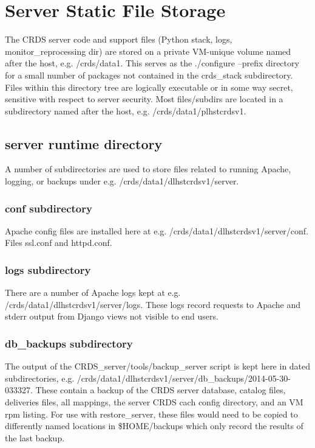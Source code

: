 \documentclass[letterpaper,10pt,english]{sphinxmanual}
\begin{document}
\section{Server Static File Storage}
\label{server_guide:server-static-file-storage}
The CRDS server code and support files (Python stack, logs, monitor\_reprocessing dir) are stored on
a private VM-unique volume named after the host,  e.g.  /crds/data1.  This serves as the
./configure --prefix directory for a small number of packages not contained in the crds\_stack subdirectory.
Files within this directory tree are logically executable or in some way secret,  sensitive with respect
to server security.   Most files/subdirs are located in a subdirectory named after the host,
e.g. /crds/data1/plhstcrdsv1.


\subsection{server runtime directory}
\label{server_guide:server-runtime-directory}
A number of subdirectories are used to store files related to running Apache, logging, or backups under
e.g. /crds/data1/dlhstcrdsv1/server.


\subsubsection{conf subdirectory}
\label{server_guide:conf-subdirectory}
Apache config files are installed here at e.g. /crds/data1/dlhstcrdsv1/server/conf.  Files ssl.conf and httpd.conf.


\subsubsection{logs subdirectory}
\label{server_guide:logs-subdirectory}
There are a number of Apache logs kept at e.g. /crds/data1/dlhstcrdsv1/server/logs.  These logs record requests to
Apache and stderr output from Django views not visible to end users.


\subsubsection{db\_backups subdirectory}
\label{server_guide:db-backups-subdirectory}
The output of the CRDS\_server/tools/backup\_server script is kept here in dated subdirectories,
e.g. /crds/data1/dlhstcrdsv1/server/db\_backups/2014-05-30-033327.  These contain a backup of the CRDS server database,
catalog files, deliveries files, all mappings, the server CRDS cach config directory, and an VM rpm listing.
For use with restore\_server,  these files would need to be copied to differently named locations in \$HOME/backups
which only record the results of the last backup.
\end{document}
